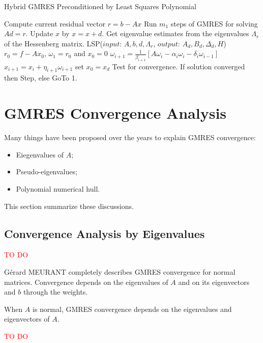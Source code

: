 \begin{algorithm}[htbp]
	\caption{Hybrid GMRES Preconditioned by Least Squares Polynomial}
	\label{alg:hybrid-gmres-ls}
	\begin{algorithmic}[1]
		\State  Compute current residual vector $r=b-Ax$
		\State Run $m_1$ steps of GMRES for solving $Ad = r$.
		\State  Update $x$ by $x=x+d$.
		\State  Get eigenvalue estimates from the eigenvalues $\Lambda_r$ of the Hessenberg matrix.
		\State  LSP($input$: $A,b,d,\Lambda_r$, $output$: $A_d, B_d, \Delta_d, H$)
		\State  $r_0=f-Ax_0$, $\omega_1 = r_0$ and $x_0=0$
		\State  $\omega_{i+1}=\frac{1}{\beta_{i+1}}[A\omega_i-\alpha_i\omega_i-\delta_i\omega_{i-1}]$
		\State  $x_{i+1}=x_i+\eta_{i+1}\omega_{i+1}$
		\EndFor
		\EndFor
		\State  set $x_0=x_d$
		\State  Test for convergence.
		\State  If solution converged then Step, else GoTo 1.
	\end{algorithmic}
\end{algorithm}


\section{GMRES Convergence Analysis}

Many things have been proposed over the years to explain GMRES convergence:

\begin{itemize}
	\item Eiegenvalues of $A$;
	\item Pseudo-eigenvalues;
	\item Polynomial numerical hull.
\end{itemize}

This section summarize these discussions.
 
\subsection{Convergence Analysis by Eigenvalues}

\textcolor{red}{TO DO}

G\'erard MEURANT completely describes GMRES convergence for normal matrices. Convergence depends on the eigenvalues of $A$ and on its eigenvectors and $b$ through the weights. 

When $A$ is normal, GMRES convergence depends on the eigenvalues and eigenvectors of $A$. 

\textcolor{red}{TO DO}

